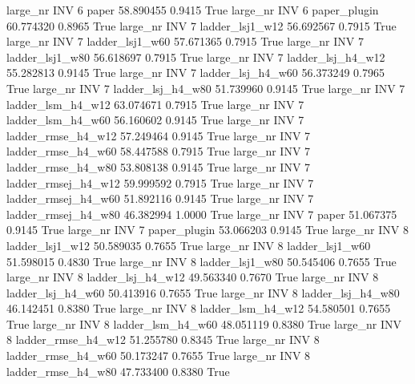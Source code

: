  large_nr      INV                 6               paper   58.890455      0.9415    True
  large_nr      INV                 6        paper_plugin   60.774320      0.8965    True
  large_nr      INV                 7     ladder_lsj1_w12   56.692567      0.7915    True
  large_nr      INV                 7     ladder_lsj1_w60   57.671365      0.7915    True
  large_nr      INV                 7     ladder_lsj1_w80   56.618697      0.7915    True
  large_nr      INV                 7   ladder_lsj_h4_w12   55.282813      0.9145    True
  large_nr      INV                 7   ladder_lsj_h4_w60   56.373249      0.7965    True
  large_nr      INV                 7   ladder_lsj_h4_w80   51.739960      0.9145    True
  large_nr      INV                 7   ladder_lsm_h4_w12   63.074671      0.7915    True
  large_nr      INV                 7   ladder_lsm_h4_w60   56.160602      0.9145    True
  large_nr      INV                 7  ladder_rmse_h4_w12   57.249464      0.9145    True
  large_nr      INV                 7  ladder_rmse_h4_w60   58.447588      0.7915    True
  large_nr      INV                 7  ladder_rmse_h4_w80   53.808138      0.9145    True
  large_nr      INV                 7 ladder_rmsej_h4_w12   59.999592      0.7915    True
  large_nr      INV                 7 ladder_rmsej_h4_w60   51.892116      0.9145    True
  large_nr      INV                 7 ladder_rmsej_h4_w80   46.382994      1.0000    True
  large_nr      INV                 7               paper   51.067375      0.9145    True
  large_nr      INV                 7        paper_plugin   53.066203      0.9145    True
  large_nr      INV                 8     ladder_lsj1_w12   50.589035      0.7655    True
  large_nr      INV                 8     ladder_lsj1_w60   51.598015      0.4830    True
  large_nr      INV                 8     ladder_lsj1_w80   50.545406      0.7655    True
  large_nr      INV                 8   ladder_lsj_h4_w12   49.563340      0.7670    True
  large_nr      INV                 8   ladder_lsj_h4_w60   50.413916      0.7655    True
  large_nr      INV                 8   ladder_lsj_h4_w80   46.142451      0.8380    True
  large_nr      INV                 8   ladder_lsm_h4_w12   54.580501      0.7655    True
  large_nr      INV                 8   ladder_lsm_h4_w60   48.051119      0.8380    True
  large_nr      INV                 8  ladder_rmse_h4_w12   51.255780      0.8345    True
  large_nr      INV                 8  ladder_rmse_h4_w60   50.173247      0.7655    True
  large_nr      INV                 8  ladder_rmse_h4_w80   47.733400      0.8380    True
